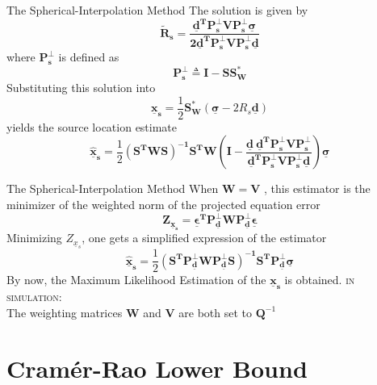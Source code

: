 \documentclass[10pt]{beamer}
\begin{document}
\begin{frame}{The Spherical-Interpolation Method}
  The solution is given by
  $$ \mathbf{\tilde{R}_s = \frac{\underline{d}^T P_s^{\bot}V P_s^{\bot}\boldsymbol{\underline{\sigma}}}{2\underline{d}^T P_s^{\bot} V P_s^{\bot}\underline{d}}}$$
  where $\mathbf{P_s^{\bot}}$ is defined as
  $$\mathbf{P_s^{\bot} \triangleq I - SS_W^*}$$
  Substituting this solution into
  $$  \mathbf{\underline{x}_s }= \frac{1}{2} \mathbf{S_W^*} (\boldsymbol{\underline{\sigma}} - 2R_s\mathbf{\underline{d}}) $$
  yields the source location estimate
  $$ \mathbf{\hat{\underline{x}}_s} = \frac{1}{2} \mathbf{(S^T W S)^{-1} S^T W (I - \frac{\underline{d}\ \underline{d}^T P_s^{\bot} V P_s^{\bot}} {\underline{d}^T P_s^{\bot} V P_s^{\bot} \underline{d}})} \boldsymbol{\underline{\sigma}} $$
\end{frame}
\begin{frame}{The Spherical-Interpolation Method}
  When $\mathbf{W = V}$ , this estimator is the minimizer of the weighted norm of the \alert{projected} equation error
  $$ \mathbf{Z_{\underline{x}_s} = \boldsymbol{\underline{\epsilon}}^T P_{\underline{d}}^{\bot} W P_{\underline{d}}^{\bot} \boldsymbol{\underline{\epsilon}} }$$
  Minimizing $Z_{\underline{x}_s}$, one gets a simplified expression of the estimator
  $$ \mathbf{\hat{\underline{x}}_s} = \frac{1}{2} \mathbf{(S^T  P_{\underline{d}}^{\bot} W P_{\underline{d}}^{\bot} S)^{-1} S^T P_{\underline{d}}^{\bot}} \boldsymbol{\underline{\sigma}} $$
  By now, the \alert{Maximum Likelihood Estimation} of the $\mathbf{\underline{x}_s}$ is obtained.
  \vfill
  \textsc{in simulation:\\}
  The weighting matrices $\textbf{W}$ and $\textbf{V}$ are both set to $\textbf{Q}^{-1}$
\end{frame}

\section{Cram\'{e}r-Rao Lower Bound}
\end{document}
